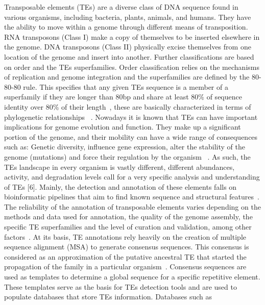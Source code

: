 \documentclass[unnumsec,webpdf,contemporary,large]{oup-authoring-template}%
\theoremstyle{thmstyleone}%
\theoremstyle{thmstyletwo}%
\theoremstyle{thmstylethree}%
\begin{document}
Transposable elements (TEs) are a diverse class of DNA sequence found in various
organisms, including bacteria, plants, animals, and humans. They have the
ability to move within a genome through different means of transposition. RNA
transposons (Class I) make a copy of themselves to be inserted elsewhere in the
genome. DNA transposons (Class II) physically excise themselves from one
location of the genome and insert into another. Further classifications are
based on order and the TEs superfamilies. Order classification relies on the
mechanisms of replication and genome integration and the superfamilies are
defined by the 80{-}80{-}80 rule. This specifies that any given TEs sequence is
a member of a superfamily if they are longer than 80bp and share at least 80\%
of sequence identity over 80\% of their length~\cite{wicker_unified_2007}, these
are basically characterized in terms of phylogenetic relationships
~\cite{feschotte_dna_2007}. Nowadays it is known that TEs can have important
implications for genome evolution and function. They make up a significant
portion of the genome, and their mobility can have a wide range of consequences
such as: Genetic diversity, influence gene expression, alter the stability of
the genome (mutations) and force their regulation by the organism
~\cite{bourque_ten_2018, arkhipova_giant_2019, pontis_primate-specific_2022}. As
such, the TEs landscape in every organism is vastly different, different
abundances, activity, and degradation levels call for a very specific analysis
and understanding of TEs [6]. Mainly, the detection and annotation of these
elements falls on bioinformatic pipelines that aim to find known sequence and
structural features~\cite{branco_transposable_2023, ou_benchmarking_2019}. The
reliability of the annotation of transposable elements varies depending on the
methods and data used for annotation, the quality of the genome assembly, the
specific TE superfamilies and the level of curation and validation, among other
factors~\cite{branco_transposable_2023}. At its basis, TE annotations rely
heavily on the creation of multiple sequence alignment (MSA) to generate
consensus sequences. This consensus is considered as an approximation of the
putative ancestral TE that started the propagation of the family in a particular
organism~\cite{branco_transposable_2023, branco_overview_2023}. Consensus
sequences are used as templates to determine a global sequence for a specific
repetitive element. These templates serve as the basis for TEs detection tools
and are used to populate databases that store TEs information. Databases such as
\end{document}

